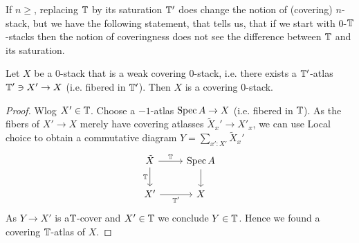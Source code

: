 \documentclass{article}
\begin{document}
 If $n \ge $, replacing $\mathbb{T}$ by its saturation $\mathbb{T}'$ does change the notion of  (covering) $n$-stack, but we have the following statement, that tells us, that if we start with  0-$\mathbb{T}$-stacks then the notion of coveringness does not see the difference between $\mathbb{T}$ and its saturation. 
\begin{prop}
    Let $X$ be a  0-stack that is a weak covering 0-stack, i.e. there exists a $\mathbb{T}'$-atlas $\mathbb{T}' \ni X' \to X$ (i.e. fibered in $\mathbb{T}'$). Then $X$ is a covering $0$-stack. 
\end{prop}
\begin{proof}
    Wlog $X' \in \mathbb{T}$. Choose a $-1$-atlas $\operatorname{Spec} A \to X$ (i.e. fibered in $\mathbb{T}$). As the fibers of $X' \to X$ merely have covering atlasses $\tilde X_x' \to X'_x$, we can use Local choice to obtain a commutative diagram $Y = \sum_{x' : X'} \tilde X_x'$
\[\begin{tikzcd}
	{\tilde X} & {\Spec A} \\
	{X'} & X
	\arrow["\bT", from=1-1, to=1-2]
	\arrow["\bT"', from=1-1, to=2-1]
	\arrow[from=1-2, to=2-2]
	\arrow["{\bT'}"', from=2-1, to=2-2]
\end{tikzcd}\]
As $Y \to X'$ is a$\mathbb{T}$-cover and $X' \in \mathbb{T}$ we conclude $Y \in \mathbb{T}$. Hence we found a covering $\mathbb{T}$-atlas of $X$. 
\end{proof}
\end{document}

